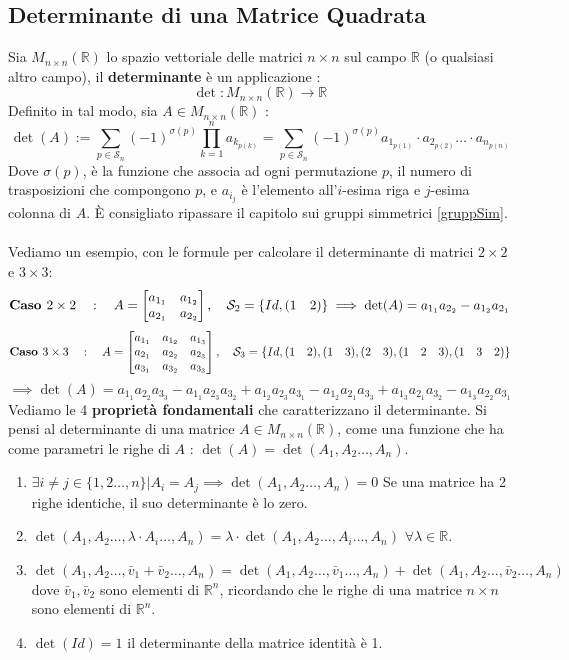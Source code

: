 \documentclass[12pt, letterpaper]{article}
\newcommand{\R}{{\mathbb R}}
\newcommand{\Sn}{{\mathcal S_n}}
\newcommand{\ve}{{\bar v}}
\newcommand{\spaz}{{\text{\hphantom{aa}}}}
\newcommand{\acc}{\\\hphantom{}\\}
\begin{document}
\subsection{Determinante di una Matrice Quadrata}\label{det}
Sia \(M_{n\times n}(\R)\) lo spazio vettoriale delle matrici 
\(n\times n\) sul campo \(\R\) (o qualsiasi altro campo), il \textbf{determinante} è un applicazione :
$$\det:M_{n\times n}(\R)\rightarrow\R$$
Definito in tal modo, sia \(A\in M_{n\times n}(\R)\) :$$\det(A):=
\sum_{p\in \Sn}(-1)^{\sigma(p)}\prod_{k=1}^{n} a_{k_{p(k)}}=
\sum_{p\in \Sn}(-1)^{\sigma(p)}a_{1_{p(1)}}\cdot
a_{2_{p(2)}}\dots \cdot a_{n_{p(n)}}$$
Dove \(\sigma(p)\), è la funzione che associa ad ogni permutazione \(p\), il numero di trasposizioni 
che compongono \(p\), e \(a_{i_j}\) è l'elemento all'\(i\)-esima riga e \(j\)-esima 
colonna di \(A\). È consigliato ripassare il capitolo sui gruppi simmetrici \ref{gruppSim}.  \acc 
Vediamo un esempio, con le formule per calcolare il determinante di matrici \(2\times 2\) e \(3\times 3\):$$
    \textbf{Caso }2\times2\spaz:\spaz A=\begin{bmatrix}
        a_{1_1}&a_{1_2}\\a_{2_1}&a_{2_2}
    \end{bmatrix},\spaz\mathcal{S}_2=\{Id,(1\spaz2)\}\implies \det(A)=a_{1_1}a_{2_2}-a_{1_2}a_{2_1} 
$$
$$\textbf{Caso }3\times3\spaz:\spaz
A=\begin{bmatrix}
    a_{1_1}&a_{1_2}&a_{1_3}
    \\a_{2_1}&a_{2_2}&a_{2_3}\\
    a_{3_1}&a_{3_2}&a_{3_3}
\end{bmatrix},\spaz\mathcal{S}_3=\{Id,(1\spaz2),(1\spaz3),(2\spaz3),(1\spaz2\spaz3),(1\spaz3\spaz2)\}
$$$$
\implies \det(A)=a_{1_1}a_{2_2}a_{3_3} - a_{1_1}a_{2_3}a_{3_2} +a_{1_2}a_{2_3}a_{3_1}-a_{1_2}a_{2_1}a_{3_3}+
a_{1_3}a_{2_1}a_{3_2}-a_{1_3}a_{2_2}a_{3_1}
$$
Vediamo le 4 \textbf{proprietà fondamentali} che caratterizzano il determinante. Si pensi al determinante di una matrice \(A
\in M_{n\times n}(\R)\), come una funzione che ha come parametri le righe di \(A\) : \(\det(A)=\det(A_1,A_2\dots,A_n)\).\begin{enumerate}
    \item \(\exists i\ne j\in \{1,2\dots,n\}|A_i=A_j\implies\det(A_1,A_2\dots,A_n)=0\) Se una matrice ha 2 righe identiche, 
    il suo determinante è lo zero.
    \item \(\det(A_1,A_2\dots,\lambda \cdot A_i\dots,A_n)=\lambda \cdot\det(A_1,A_2\dots, A_i\dots,A_n)\) \(\forall \lambda \in \R\).
    \item \(\det(A_1,A_2\dots, \ve_1+\ve_2\dots,A_n)=\det(A_1,A_2\dots, \ve_1\dots,A_n)+\det(A_1,A_2\dots, \ve_2\dots,A_n)\) 
    dove \(\ve_1,\ve_2\) sono elementi di \(\R^n\), ricordando che le righe di una matrice \(n\times n\) sono elementi di \(\R^n\).
    \item \(\det(Id)=1\) il determinante della matrice identità è 1. 
\end{enumerate}
\end{document}
